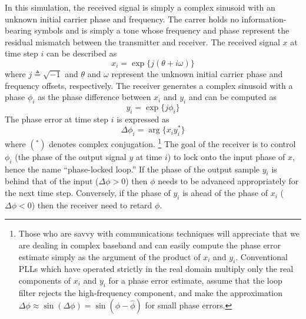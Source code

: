 In this simulation, the received signal is simply a complex sinusoid
with an unknown initial carrier phase and frequency.
The carrer holds no information-bearing symbols and is simply a tone
whose frequency and phase represent the residual mismatch between the
transmitter and receiver.
The received signal $x$ at time step $i$ can be described as
%
\begin{equation}
\label{eqn:tutoral:pll:x}
    x_i = \exp\bigl\{ j(\theta + i\omega) \bigr\}
\end{equation}
%
where $j \triangleq \sqrt{-1}$ and
$\theta$ and $\omega$ represent the unknown initial carrier phase and
frequency offsets, respectively.
The receiver generates a complex sinusoid with a phase $\phi_i$ as the
phase difference between $x_i$ and $y_i$ and can be computed as
%
\begin{equation}
\label{eqn:tutoral:pll:y}
    y_i = \exp\bigl\{j\phi_i\bigr\}
\end{equation}
%
The phase error at time step $i$ is expressed as
%
\begin{equation}
\label{eqn:tutoral:pll:dphi}
    \Delta\phi_i = \arg\bigl\{ x_i y_i^* \bigr\}
\end{equation}
%
where $(^*)$ denotes complex conjugation.%
\footnote{
    Those who are savvy with communications techniques will
    appreciate that we are dealing in complex baseband and can easily
    compute the phase error estimate simply as the argument of the
    product of $x_i$ and $y_i$.
    Conventional PLLs which have operated strictly in the real domain
    multiply only the real components of $x_i$ and $y_i$ for a phase
    error estimate, assume that the loop filter rejects the
    high-frequency component, and make the approximation
    $\Delta\phi \approx \sin(\Delta\phi) = \sin(\phi-\hat{\phi})$
    for small phase errors.}
The goal of the receiver is to control $\phi_i$
(the phase of the output signal $y$ at time $i$)
to lock onto the input phase of $x$,
hence the name ``phase-locked loop.''
If the phase of the output sample $y_i$ is behind that of the input
($\Delta\phi > 0$) then $\phi$ needs to be advanced appropriately for
the next time step.
Conversely, if the phase of $y_i$ is ahead of the phase of $x_i$
($\Delta\phi < 0$) then the receiver need to retard $\phi$.

